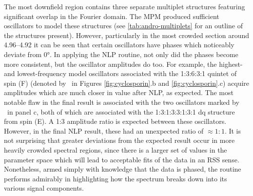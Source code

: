 The most downfield region contains three separate multiplet structures
featuring significant overlap in the Fourier domain.
The \ac{MPM} produced sufficient oscillators to model these
structures (see \cref{tab:andro-multiplets} for an outline of the structures
present).
However, particularly in the most crowded section around
\SIrange{4.96}{4.92}{\partspermillion} it can be seen that certain oscillators
have phases which noticeably deviate from \ang{0}. In applying the \ac{NLP}
routine, not only did the phases become more consistent,
but the oscillator amplitudes do too.
For example, the highest- and lowest-frequency model oscillators
associated with the 1:3:6:3:1 quintet of spin (F) (denoted by
\textdagger\ in Figures \ref{fig:cyclosporin}.b and \ref{fig:cyclosporin}.c)
acquire amplitudes which are much closer in value after \ac{NLP}, as expected.
The most
notable flaw in the final result is associated with the two oscillators marked
by \textdaggerdbl\ in panel c, both of which are associated with the
1:3:1:3:3:1:3:1 dq structure from spin (E). A 1:3 amplitude ratio is expected
between these oscillators. However, in the final \ac{NLP} result, these
had an unexpected ratio of $\approx 1:1$. It is not surprising
that greater deviations from the expected result occur in more heavily crowded spectral
regions, since there is a larger set of values in the parameter space which
will lead to acceptable fits of the data in an \ac{RSS} sense. Nonetheless,
armed simply with knowledge that the data is phased, the routine performs
admirably in highlighting  how the spectrum breaks down into its various
signal components.
